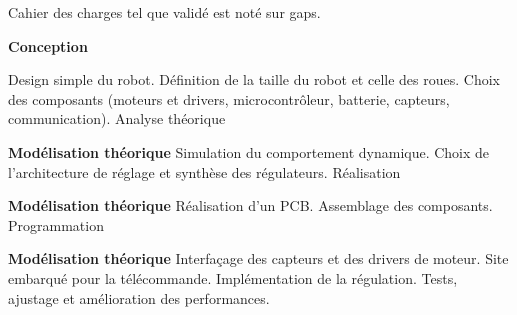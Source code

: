 Cahier des charges tel que validé est noté sur gaps.

\textbf{Conception}

Design simple du robot.
Définition de la taille du robot et celle des roues.
Choix des composants (moteurs et drivers, microcontrôleur, batterie, capteurs, communication).
Analyse théorique

\textbf{Modélisation théorique}
Simulation du comportement dynamique.
Choix de l'architecture de réglage et synthèse des régulateurs.
Réalisation

\textbf{Modélisation théorique}
Réalisation d'un PCB.
Assemblage des composants.
Programmation

\textbf{Modélisation théorique}
Interfaçage des capteurs et des drivers de moteur.
Site embarqué pour la télécommande.
Implémentation de la régulation.
Tests, ajustage et amélioration des performances.